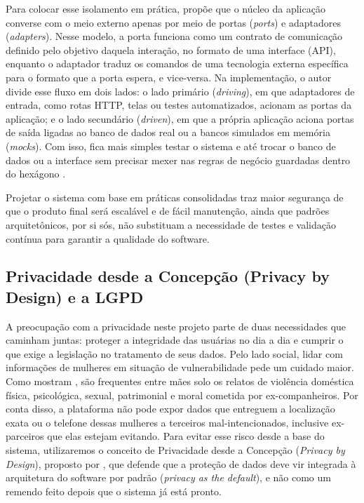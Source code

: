 Para colocar esse isolamento em prática, \textcite[2-4]{cockburn2005} propõe que o núcleo da aplicação converse com o meio externo apenas por meio de portas (\textit{ports}) e adaptadores (\textit{adapters}). Nesse modelo, a porta funciona como um contrato de comunicação definido pelo objetivo daquela interação, no formato de uma interface (API), enquanto o adaptador traduz os comandos de uma tecnologia externa específica para o formato que a porta espera, e vice-versa. Na implementação, o autor divide esse fluxo em dois lados: o lado primário (\textit{driving}), em que adaptadores de entrada, como rotas HTTP, telas ou testes automatizados, acionam as portas da aplicação; e o lado secundário (\textit{driven}), em que a própria aplicação aciona portas de saída ligadas ao banco de dados real ou a bancos simulados em memória (\textit{mocks}). Com isso, fica mais simples testar o sistema e até trocar o banco de dados ou a interface sem precisar mexer nas regras de negócio guardadas dentro do hexágono \cite[4, 9-10]{cockburn2005}.

Projetar o sistema com base em práticas consolidadas traz maior segurança de que o produto final será escalável e de fácil manutenção, ainda que padrões arquitetônicos, por si sós, não substituam a necessidade de testes e validação contínua para garantir a qualidade do software.

\subsection{Privacidade desde a Concepção (Privacy by Design) e a LGPD}
A preocupação com a privacidade neste projeto parte de duas necessidades que caminham juntas: proteger a integridade das usuárias no dia a dia e cumprir o que exige a legislação no tratamento de seus dados. Pelo lado social, lidar com informações de mulheres em situação de vulnerabilidade pede um cuidado maior. Como mostram \textcite[11]{araujo2025}, são frequentes entre mães solo os relatos de violência doméstica física, psicológica, sexual, patrimonial e moral cometida por ex-companheiros. Por conta disso, a plataforma não pode expor dados que entreguem a localização exata ou o telefone dessas mulheres a terceiros mal-intencionados, inclusive ex-parceiros que elas estejam evitando. Para evitar esse risco desde a base do sistema, utilizaremos o conceito de Privacidade desde a Concepção (\textit{Privacy by Design}), proposto por \textcite{cavoukian2009}, que defende que a proteção de dados deve vir integrada à arquitetura do software por padrão (\textit{privacy as the default}), e não como um remendo feito depois que o sistema já está pronto.

